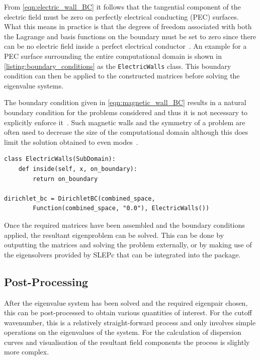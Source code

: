 From \eqref{eqn:electric_wall_BC} it follows that the tangential
component of the electric field must be zero on perfectly electrical
conducting (PEC) surfaces. What this means in practice is that the
degrees of freedom associated with both the Lagrange and \nedelec{}
basis functions on the boundary must be set to zero since there can be
no electric field inside a perfect electrical
conductor~\cite{Smi1997}. An example for a PEC surface surrounding the
entire computational domain is shown in \lstlistingname{}
\ref{listing:boundary_conditions} as the {\tt ElectricWalls}
class. This boundary condition can then be applied to the constructed
matrices before solving the eigenvalue systems.

The boundary condition given in \eqref{eqn:magnetic_wall_BC} results
in a natural boundary condition for the problems considered and thus
it is not necessary to explicitly enforce it~\cite{PelCoc1998}.  Such
magnetic walls and the symmetry of a problem are often used to
decrease the size of the computational domain although this does limit
the solution obtained to even modes~\cite{Jin2002}.

\begin{lstlisting}[float=h, caption=Boundary conditions., label=listing:boundary_conditions]
class ElectricWalls(SubDomain):
    def inside(self, x, on_boundary):
        return on_boundary

dirichlet_bc = DirichletBC(combined_space,
        Function(combined_space, "0.0"), ElectricWalls())
\end{lstlisting}

Once the required matrices have been assembled and the boundary
conditions applied, the resultant eigenproblem can be solved. This can
be done by outputting the matrices and solving the problem externally,
or by making use of the eigensolvers provided by SLEPc that can be
integrated into the \fenics{} package.

\subsection{Post-Processing}

After the eigenvalue system has been solved and the required eigenpair
chosen, this can be post-processed to obtain various quantities of
interest. For the cutoff wavenumber, this is
a relatively straight-forward process and only involves simple
operations on the eigenvalues of the system. For the calculation of
dispersion curves and visualisation of the resultant field components
the process is slightly more complex.

